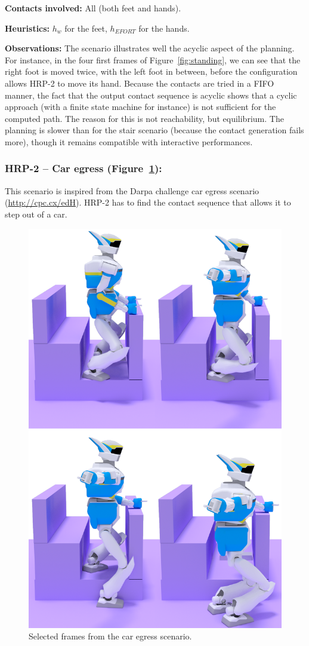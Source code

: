 \noindent\textbf{Contacts involved:} All (both feet and hands).

\noindent\textbf{Heuristics:} $h_w$ for the feet, $h_{EFORT}$  for the hands.

\noindent\textbf{Observations:} The scenario illustrates well the acyclic aspect of the planning. For instance, in the four first frames of Figure~\ref{fig:standing}, we can see that the right foot
is moved twice, with the left foot in between, before the configuration allows HRP-2 to move its hand.
Because the contacts are tried in a FIFO manner, the fact that the output contact sequence is acyclic shows that a cyclic approach (with a finite state machine for instance) is not sufficient
for the computed path. The reason for this is not reachability, but equilibrium. The planning is slower than for the stair scenario (because the contact generation fails more),
though it remains compatible with \gls{interactive} performances. %


\subsubsection{HRP-2 -- Car egress (Figure~\ref{fig:car}):}
This scenario is inspired from the Darpa challenge car egress scenario (\url{http://cpc.cx/edH}). HRP-2 has 
to find the contact sequence that allows it to step out of a car.

\begin{figure}
  \centering
  \includegraphics[width=0.5\linewidth]{figures/car}
  \caption{
           Selected frames from the car egress scenario. }
		   \label{fig:car}
\end{figure}


